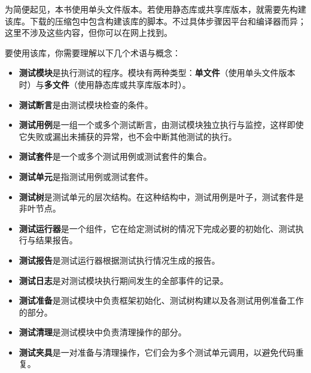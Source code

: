 
为简便起见，本书使用单头文件版本。若使用静态库或共享库版本，就需要先构建该库。下载的压缩包中包含构建该库的脚本。不过具体步骤因平台和编译器而异；这里不涉及这些内容，但你可以在网上找到。



要使用该库，你需要理解以下几个术语与概念：



\begin{itemize}
\item \textbf{测试模块}是执行测试的程序。模块有两种类型：\textbf{单文件}（使用单头文件版本时）与\textbf{多文件}（使用静态库或共享库版本时）。



\item \textbf{测试断言}是由测试模块检查的条件。



\item \textbf{测试用例}是一组一个或多个测试断言，由测试模块独立执行与监控，这样即使它失败或漏出未捕获的异常，也不会中断其他测试的执行。



\item \textbf{测试套件}是一个或多个测试用例或测试套件的集合。



\item \textbf{测试单元}是指测试用例或测试套件。



\item \textbf{测试树}是测试单元的层次结构。在这种结构中，测试用例是叶子，测试套件是非叶节点。



\item \textbf{测试运行器}是一个组件，它在给定测试树的情况下完成必要的初始化、测试执行与结果报告。



\item \textbf{测试报告}是测试运行器根据测试执行情况生成的报告。



\item \textbf{测试日志}是对测试模块执行期间发生的全部事件的记录。



\item \textbf{测试准备}是测试模块中负责框架初始化、测试树构建以及各测试用例准备工作的部分。



\item \textbf{测试清理}是测试模块中负责清理操作的部分。



\item \textbf{测试夹具}是一对准备与清理操作，它们会为多个测试单元调用，以避免代码重复。


\end{itemize}


